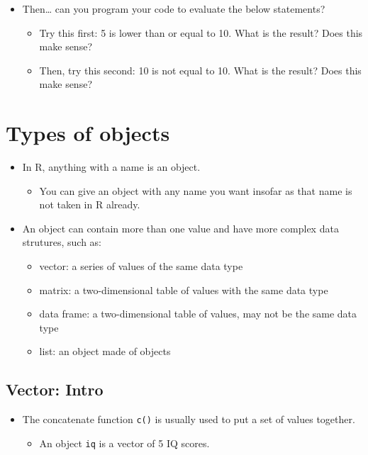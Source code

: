 \documentclass[
]{book}
\providecommand{\tightlist}{%
  \setlength{\itemsep}{0pt}\setlength{\parskip}{0pt}}
\begin{document}
\begin{itemize}
\tightlist
\item
  Then\ldots{} can you program your code to evaluate the below statements?

  \begin{itemize}
  \tightlist
  \item
    Try this first: 5 is lower than or equal to 10. What is the result? Does this make sense?
  \item
    Then, try this second: 10 is not equal to 10. What is the result? Does this make sense?
  \end{itemize}
\end{itemize}

\section{Types of objects}\label{types-of-objects}

\begin{itemize}
\tightlist
\item
  In R, anything with a name is an object.

  \begin{itemize}
  \tightlist
  \item
    You can give an object with any name you want insofar as that name is not taken in R already.
  \end{itemize}
\item
  An object can contain more than one value and have more complex data strutures, such as:

  \begin{itemize}
  \tightlist
  \item
    vector: a series of values of the same data type
  \item
    matrix: a two-dimensional table of values with the same data type
  \item
    data frame: a two-dimensional table of values, may not be the same data type
  \item
    list: an object made of objects
  \end{itemize}
\end{itemize}

\subsection{Vector: Intro}\label{vector-intro}

\begin{itemize}
\tightlist
\item
  The concatenate function \texttt{c()} is usually used to put a set of values together.

  \begin{itemize}
  \tightlist
  \item
    An object \texttt{iq} is a vector of 5 IQ scores.
  \end{itemize}
\end{itemize}
\end{document}
